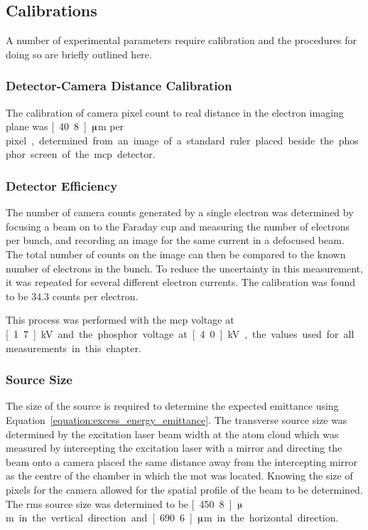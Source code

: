 \subsection{Calibrations}
A number of experimental parameters require calibration and the procedures for doing so are briefly outlined here.

\subsubsection{Detector-Camera Distance Calibration}
The calibration of camera pixel count to real distance in the electron imaging plane was \unit[40.8]{$\muup$m per pixel}, determined from an image of a standard ruler placed beside the phosphor screen of the \gls{mcp} detector.

\subsubsection{Detector Efficiency}
The number of camera counts generated by a single electron was determined by focusing a beam on to the Faraday cup and measuring the number of electrons per bunch, and recording an image for the same current in a defocused beam.
The total number of counts on the image can then be compared to the known number of electrons in the bunch.
To reduce the uncertainty in this measurement, it was repeated for several different electron currents.
The calibration was found to be 34.3 counts per electron.

This process was performed with the \gls{mcp} voltage at \unit[1.7]{kV} and the phosphor voltage at \unit[4.0]{kV}, the values used for all measurements in this chapter.

\subsubsection{Source Size}
The size of the source is required to determine the expected emittance using Equation~\ref{equation:excess_energy_emittance}.
The transverse source size was determined by the excitation laser beam width at the atom cloud which was measured by intercepting the excitation laser with a mirror and directing the beam onto a camera placed the same distance away from the intercepting mirror as the centre of the chamber in which the \gls{mot} was located.
Knowing the size of pixels for the camera allowed for the spatial profile of the beam to be determined.
The \gls{rms} source size was determined to be \unit[450.8]{$\muup$m} in the vertical direction and \unit[690.6]{$\muup$m} in the horizontal direction.

